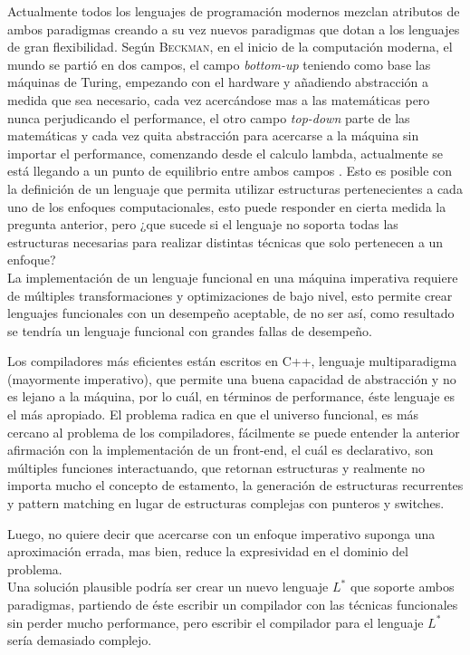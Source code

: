 Actualmente todos los lenguajes de programación modernos mezclan atributos de ambos paradigmas creando a su vez nuevos paradigmas que dotan a los lenguajes de gran flexibilidad. Según \textsc{Beckman}, en el inicio de la computación moderna, el mundo se partió en dos campos, el campo \emph{bottom-up} teniendo como base las máquinas de Turing, empezando con el hardware y añadiendo abstracción a medida que sea necesario, cada vez acercándose mas a las matemáticas pero nunca perjudicando el performance, el otro campo \emph{top-down} parte de las matemáticas y cada vez quita abstracción para acercarse a la máquina sin importar el performance, comenzando desde el calculo lambda, actualmente se está llegando a un punto de equilibrio entre ambos campos \cite{Beckman2007}  . Esto es posible con la definición de un lenguaje que permita utilizar estructuras pertenecientes a cada uno de los enfoques computacionales, esto puede responder en cierta medida la pregunta anterior, pero ¿que sucede si el lenguaje no soporta todas las estructuras necesarias para realizar distintas técnicas que solo pertenecen a un enfoque?\\

La implementación de un lenguaje funcional en una máquina imperativa requiere de múltiples transformaciones y optimizaciones de bajo nivel, esto permite crear lenguajes funcionales con un desempeño aceptable, de no ser así, como resultado se tendría un lenguaje funcional con grandes fallas de desempeño.

Los compiladores más eficientes están escritos en C++, lenguaje multiparadigma (mayormente imperativo), que permite una buena capacidad de abstracción y no es lejano a la máquina, por lo cuál, en términos de performance, éste lenguaje es el más apropiado. El problema radica en que el universo funcional, es más cercano al problema de los compiladores, fácilmente se puede entender la anterior afirmación con la implementación de un front-end, el cuál es declarativo, son múltiples funciones interactuando, que retornan estructuras y realmente no importa mucho el concepto de estamento, la generación de estructuras recurrentes y pattern matching en lugar de estructuras complejas con punteros y switches.

Luego, no quiere decir que acercarse con un enfoque imperativo suponga una aproximación errada, mas bien, reduce la expresividad en el dominio del problema.\\

Una solución plausible podría ser crear un nuevo lenguaje $L^*$ que soporte ambos paradigmas, partiendo de éste escribir un compilador con las técnicas funcionales sin perder mucho performance, pero escribir el compilador para el lenguaje $L^*$ sería demasiado complejo.



